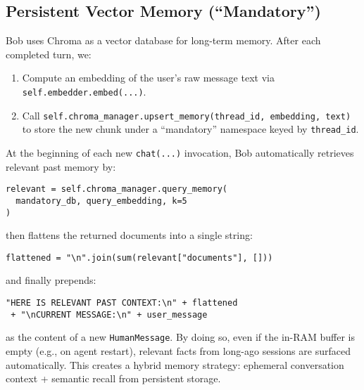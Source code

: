 \documentclass[11pt]{article}
\begin{document}
\subsection{Persistent Vector Memory (“Mandatory”)}
Bob uses Chroma as a vector database for long-term memory. After each completed turn, we:
\begin{enumerate}[leftmargin=*]
  \item Compute an embedding of the user’s raw message text via \texttt{self.embedder.embed(...)}.
  \item Call \texttt{self.chroma\_manager.upsert\_memory(thread\_id, embedding, text)} to store the new chunk under a “mandatory” namespace keyed by \texttt{thread\_id}.
\end{enumerate}

At the beginning of each new \texttt{chat(...)} invocation, Bob automatically retrieves relevant past memory by:
\begin{verbatim}
relevant = self.chroma_manager.query_memory(
  mandatory_db, query_embedding, k=5
)
\end{verbatim}
then flattens the returned documents into a single string:
\begin{verbatim}
flattened = "\n".join(sum(relevant["documents"], []))
\end{verbatim}
and finally prepends:
\begin{verbatim}
"HERE IS RELEVANT PAST CONTEXT:\n" + flattened
 + "\nCURRENT MESSAGE:\n" + user_message
\end{verbatim}
as the content of a new \texttt{HumanMessage}. By doing so, even if the in-RAM buffer is empty (e.g., on agent restart), relevant facts from long-ago sessions are surfaced automatically. This creates a hybrid memory strategy: ephemeral conversation context + semantic recall from persistent storage.
\end{document}
